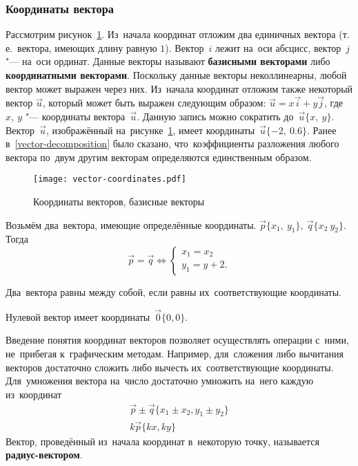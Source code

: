 \documentclass[]{scrartcl}
\begin{document}
\subsubsection{Координаты вектора}
Рассмотрим рисунок~\ref{fig:vec-coord-1}. Из~начала координат отложим два единичных вектора (т.\,е.~вектора, имеющих длину равную ${\textstyle 1}$). Вектор~${\textstyle i}$ лежит на~оси абсцисс, вектор~${\textstyle j}$ "--- на~оси ординат. Данные векторы называют \textbf{базисными векторами} либо \textbf{координатными векторами}. Поскольку данные векторы неколлинеарны, любой вектор может выражен через них. Из~начала координат отложим также некоторый вектор ${\textstyle \vec{u}}$, который может быть выражен следующим образом: ${\textstyle \vec{u}=x\vec{i}+y\vec{j}}$, где~${\textstyle x,\ y}$ "--- координаты вектора~${\textstyle \vec{u}}$. Данную запись можно сократить до~${\textstyle \vec{u}\{x,\ y\}}$. Вектор~${\textstyle \vec{u}}$, изображённый на~рисунке~\ref{fig:vec-coord-1}, имеет координаты~${\textstyle \vec{u}\{-2,\ 0.6\}}$. Ранее в~\ref{vector-decomposition} было сказано, что~коэффициенты разложения любого вектора по~двум другим векторам определяются единственным образом. 
\begin{figure}[ht]
	\centering %
	\texttt{[image: vector-coordinates.pdf]}
	\caption{Координаты векторов, базисные векторы}\label{fig:vec-coord-1}
\end{figure}
Возьмём два~вектора, имеющие определённые координаты. ${\textstyle \vec{p}\{x_1,\ y_1\},\ \vec{q}\{x_2 \ y_2\}}$. Тогда
\begin{equation}\label{eq:two-vec-equality}
\vec{p}=\vec{q}\Leftrightarrow
\begin{cases}
x_1=x_2\\
y_1=y+2.
\end{cases}
\end{equation}
\begin{proposition}
	Два~вектора равны между собой, если равны их~соответствующие координаты.
\end{proposition}
\begin{proposition}
	Нулевой вектор имеет координаты~${\textstyle \vec{0}\{0,0\}}$. 
\end{proposition}
Введение понятия координат векторов позволяет осуществлять операции с~ними, не~прибегая к~графическим методам. Например, для~сложения либо вычитания векторов достаточно сложить либо вычесть их~соответствующие координаты. Для~умножения вектора на~число достаточно умножить на~него каждую из~координат
\begin{equation}\label{eq:two-vectors-sum-or-subtraction}
\begin{aligned}
\vec{p}\pm\vec{q}\{x_{1}\pm x_{2},y_{1}\pm y_{2}\}\\
k\vec{p}\{kx,ky\}
\end{aligned}
\end{equation}
Вектор, проведённый из~начала координат в~некоторую точку, называется \textbf{радиус-вектором}. 
\end{document}
